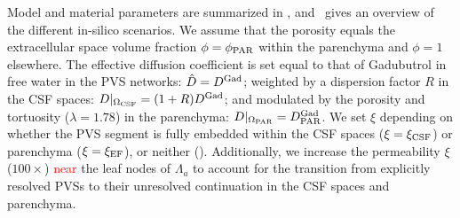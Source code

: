 \documentclass[fleqn,10pt]{wlscirep}
\newcommand{\fixme}[1]{\textcolor{red}{#1}}
\begin{document}
Model and material parameters are summarized in ,
and~ gives an overview of the different in-silico
scenarios. We assume that the porosity equals the extracellular space
volume fraction $\phi = \phi_{\rm PAR}$ within the parenchyma and
$\phi = 1$ elsewhere. The effective diffusion coefficient is set equal
to that of Gadubutrol in free water in the PVS networks: $\hat{D} =
D^{\rm Gad}$; weighted by a dispersion factor $R$ in the CSF spaces:
$D|_{\Omega_{\rm CSF}} = ( 1 + R) D^{\rm Gad}$; and modulated by the
porosity and tortuosity ($\lambda = 1.78$) in the parenchyma:
$D|_{\Omega_{\rm PAR}} = D^{\rm Gad}_{\rm PAR}$. We set $\xi$
depending on whether the PVS segment is fully embedded within the CSF
spaces ($\xi = \xi_{\rm CSF}$) or parenchyma ($\xi = \xi_{\rm EF}$),
or neither (). Additionally, we increase the
permeability $\xi$ ($100\times$) \fixme{near} the leaf nodes of
$\Lambda_a$ to account for the transition from explicitly resolved
PVSs to their unresolved continuation in the CSF spaces and
parenchyma.
\end{document}

